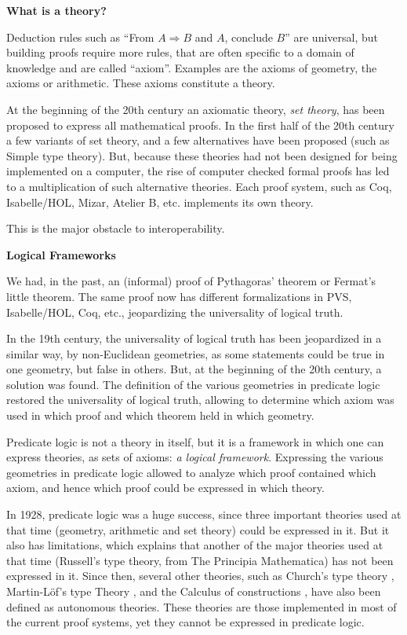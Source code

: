 \begin{framed}
\begin{center}
{\bf \Large What is a theory?}
\end{center}

Deduction rules such as ``From $A \Rightarrow B$ and $A$, conclude
$B$'' are universal, but building proofs require more rules, that are
often specific to a domain of knowledge and are called
``axiom''. Examples are the axioms of geometry, the axioms or
arithmetic. These axioms constitute a theory.

At the beginning of the 20th century an axiomatic theory, {\em set
  theory}, has been proposed to express all mathematical proofs. In
the first half of the 20th century a few variants of set theory, and a
few alternatives have been proposed (such as Simple type theory).
But, because these theories had not been designed for being
implemented on a computer, the rise of computer checked formal proofs
has led to a multiplication of such alternative theories. Each proof system,
such as Coq, Isabelle/HOL, Mizar, Atelier B,
etc. implements its own theory.

This is the major obstacle to interoperability.
\end{framed}

\bigskip

\noindent
{\bf \Large Logical Frameworks}

We had, in the past, an (informal) proof of Pythagoras’ theorem
or Fermat’s little theorem. The same proof now has different
formalizations in PVS, Isabelle/HOL, Coq, etc., jeopardizing the
universality of logical truth.

In the 19th century, the universality of logical truth has been
jeopardized in a similar way, by non-Euclidean geometries, as some
statements could be true in one geometry, but false in others.  But,
at the beginning of the 20th century, a solution was found.  The
definition of the various geometries in predicate logic
\cite{HilbertAckermann} restored the universality of logical truth,
allowing to determine which axiom was used in which proof and which
theorem held in which geometry.

Predicate logic is not a theory in itself, but it is a framework in
which one can express theories, as sets of axioms: {\em a logical
  framework}.  Expressing the various geometries in predicate logic
allowed to analyze which proof contained which axiom, and hence which
proof could be expressed in which theory.

In 1928, predicate logic was a huge success, since three important
theories used at that time (geometry, arithmetic and set theory) could
be expressed in it. But it also has limitations, which explains that
another of the major theories used at that time (Russell's type
theory, from The Principia Mathematica) has not been expressed in
it. Since then, several other theories, such as Church's type theory
\cite{Church40}, Martin-L\"of's type Theory \cite{Martin-Lof84}, and
the Calculus of constructions \cite{CoquandHuet88}, have also been
defined as autonomous theories. These theories are those implemented
in most of the current proof systems, yet they cannot be expressed in
predicate logic.

